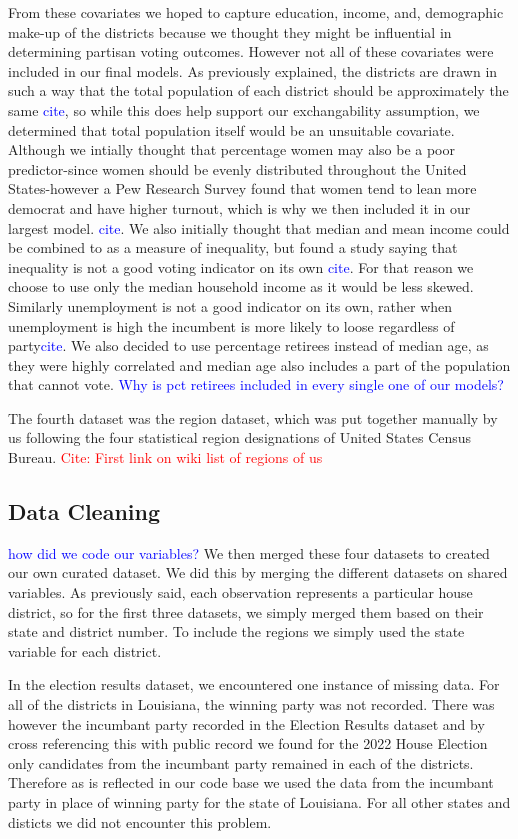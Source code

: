 \documentclass[12pt]{article}
\newcommand{\blue}[1]{\textcolor{blue}{#1}}
\begin{document}
From these covariates we hoped to capture education, income, and, demographic make-up  of the districts because we thought they might be influential in determining partisan voting outcomes. However not all of these covariates were included in our final models. As previously explained, the districts are drawn in such a way that the total population of each district should be approximately the same \blue{cite}, so while this does help support our exchangability assumption, we determined that total population itself would be an unsuitable covariate. Although we intially thought that percentage women may also be a poor predictor-since women should be evenly distributed throughout the United States-however a Pew Research Survey found that women tend to lean more democrat and have higher turnout, which is why we then included it in our largest model. \blue{cite}. We also initially thought that median and mean income could be combined to as a measure of inequality, but found a study saying that inequality is not a good voting indicator on its own \blue{cite}. For that reason we choose to use only the median household income as it would be less skewed. Similarly unemployment is not a good indicator on its own, rather when unemployment is high the incumbent is more likely to loose regardless of party\blue{cite}.  We also decided to use percentage retirees instead of median age, as they were highly correlated and median age also includes a part of the population that cannot vote. 
\blue{ Why is pct retirees included in every single one of our models? }


The fourth dataset was the region dataset, which was put together manually by us following the four statistical region designations of United States Census Bureau. \textcolor{red}{Cite: First link on wiki list of regions of us }

\subsection*{Data Cleaning}

 \blue{how did we code our variables? }
We then merged these four datasets to created our own curated dataset. We did this by merging the different datasets on shared variables. As previously said, each observation represents a particular house district, so for the first three datasets, we simply merged them based on their state and district number. To include the regions we simply used the state variable for each district. 

In the election results dataset, we encountered one instance of missing data. For all of the districts in Louisiana, the winning party was not recorded. There was however the incumbant party recorded  in the Election Results dataset and by cross referencing this with public record we found for the 2022 House Election only candidates from the incumbant party remained in each of the districts. Therefore as is reflected in our code base we used the data from the incumbant party in place of winning party for the state of Louisiana. For all other states and disticts we did not encounter this problem. 
\end{document}
